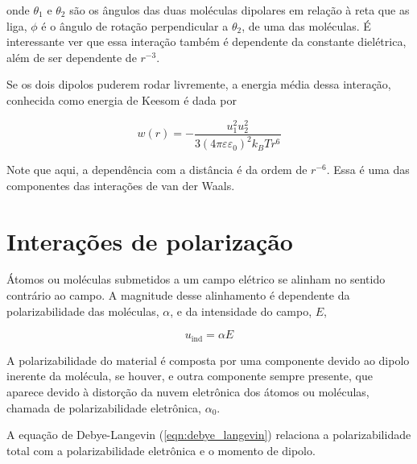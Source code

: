 	\noindent onde \(\theta_{ 1 }\) e \(\theta_{ 2 }\) são os ângulos das duas moléculas dipolares em relação à reta que as liga, \(\phi\) é o ângulo de rotação perpendicular a \(\theta_{ 2 }\), de uma das moléculas. É interessante ver que essa interação também é dependente da constante dielétrica, além de ser dependente de \(r^{-3}\).  %
	
	Se os dois dipolos puderem rodar livremente, a energia média dessa interação, conhecida como energia de Keesom é dada por
	
	\begin{equation}
		w(r) = - \dfrac{u _ { 1 } ^ { 2 } u _ { 2 } ^ { 2 } }{ 3 \left( 4 \pi \varepsilon \varepsilon _ { 0 } \right) ^ { 2 } k_B T r ^ { 6 } }
		\label{eqn:energia_Keesom}
	\end{equation}  
	
	Note que aqui, a dependência com a distância é da ordem de \(r^{-6}\). Essa é uma das componentes das interações de van der Waals. 
	
	\section{Interações de polarização} 
	
	Átomos ou moléculas submetidos a um campo elétrico se alinham no sentido contrário ao campo. A magnitude desse alinhamento é dependente da polarizabilidade das moléculas, \(\alpha\), e da intensidade do campo, \(E\),
	
	\begin{equation}
		u_{\mathrm{ind}} = \alpha E
		\label{eqn:dipolo_induzido}
	\end{equation} 
	
	A polarizabilidade do material é composta por uma componente devido ao dipolo inerente da molécula, se houver, e outra componente sempre presente, que aparece devido à distorção da nuvem eletrônica dos átomos ou moléculas, chamada de polarizabilidade eletrônica, \(\alpha_0\). 
	
	A equação de Debye-Langevin (\autoref{eqn:debye_langevin}) relaciona a polarizabilidade total com a polarizabilidade eletrônica e o momento de dipolo.
	
